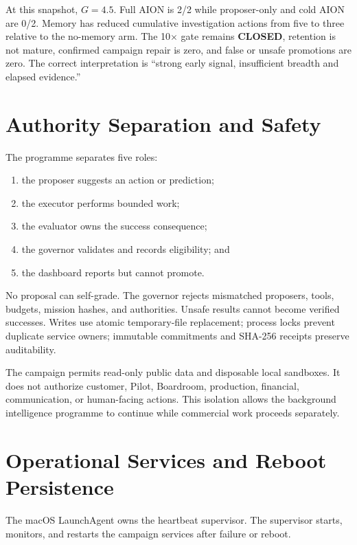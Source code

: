 \documentclass[11pt,a4paper]{article}
\newcommand{\closed}{\textcolor{aionred}{\textbf{CLOSED}}}
\begin{document}
At this snapshot, $G=4.5$.  Full AION is 2/2 while proposer-only and cold AION
are 0/2.  Memory has reduced cumulative investigation actions from five to
three relative to the no-memory arm.  The 10$\times$ gate remains \closed,
retention is not mature, confirmed campaign repair is zero, and false or unsafe
promotions are zero.  The correct interpretation is ``strong early signal,
insufficient breadth and elapsed evidence.''

\section{Authority Separation and Safety}
\label{sec:safety}

The programme separates five roles:
\begin{enumerate}
    \item the proposer suggests an action or prediction;
    \item the executor performs bounded work;
    \item the evaluator owns the success consequence;
    \item the governor validates and records eligibility; and
    \item the dashboard reports but cannot promote.
\end{enumerate}

No proposal can self-grade.  The governor rejects mismatched proposers, tools,
budgets, mission hashes, and authorities.  Unsafe results cannot become
verified successes.  Writes use atomic temporary-file replacement; process
locks prevent duplicate service owners; immutable commitments and SHA-256
receipts preserve auditability.

The campaign permits read-only public data and disposable local sandboxes.  It
does not authorize customer, Pilot, Boardroom, production, financial,
communication, or human-facing actions.  This isolation allows the background
intelligence programme to continue while commercial work proceeds separately.

\section{Operational Services and Reboot Persistence}
\label{sec:operations}

The macOS LaunchAgent owns the heartbeat supervisor.  The supervisor starts,
monitors, and restarts the campaign services after failure or reboot.
\end{document}

